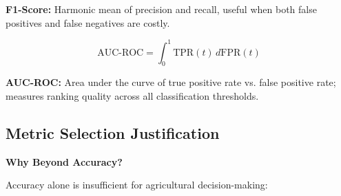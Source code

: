 \documentclass[11pt,a4paper]{article}
\begin{document}
\textbf{F1-Score:} Harmonic mean of precision and recall, useful when both false positives and false negatives are costly.

\begin{equation}
\text{AUC-ROC} = \int_0^1 \text{TPR}(t) \, d\text{FPR}(t)
\end{equation}

\textbf{AUC-ROC:} Area under the curve of true positive rate vs. false positive rate; measures ranking quality across all classification thresholds.

\subsection{Metric Selection Justification}

\textbf{Why Beyond Accuracy?}

Accuracy alone is insufficient for agricultural decision-making:
\end{document}
